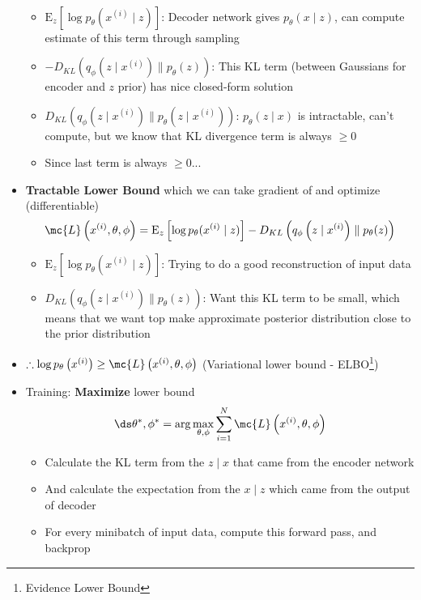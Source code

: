 \begin{itemize}
$$\begin{aligned}
	\end{aligned}$$
	\begin{itemize}
		\item $\mathrm{E}_{z}\left[\log p_\theta(x^{(i)} \mid z)\right]$: Decoder network gives $p_\theta(x\mid z)$, can compute estimate of this term through sampling
		\item $- D_{KL}\left(q_\phi\left(z\mid x^{(i)}\right) \parallel p_\theta(z) \right)$: This KL term (between Gaussians for encoder and $z$ prior) has nice closed-form solution
		\item $D_{KL}\left(q_\phi\left(z\mid x^{(i)}\right) \parallel p_\theta\left(z\mid x^{(i)}\right)\right)$: $p_\theta(z\mid x)$ is intractable, can't compute, but we know that KL divergence term is always $\geq 0$
		\item Since last term is always $\geq 0$...
	\end{itemize}
	\item \textbf{Tractable Lower Bound} which we can take gradient of and optimize (differentiable)
	$$\mc{L}\left(x^{(i)}, \theta, \phi \right) =\mathrm{E}_{z}\left[\log p_\theta(x^{(i)} \mid z)\right] - D_{KL}\left(q_\phi\left(z\mid x^{(i)}\right) \parallel p_\theta(z) \right) $$
	\begin{itemize}
		\item $\mathrm{E}_{z}\left[\log p_\theta(x^{(i)} \mid z)\right]$: Trying to do a good reconstruction of input data
		\item $D_{KL}\left(q_\phi\left(z\mid x^{(i)}\right) \parallel p_\theta(z) \right)$: Want this KL term to be small, which means that we want top make approximate posterior distribution close to the prior distribution 
	\end{itemize}
	\item $\therefore \log p_\theta\left(x^{(i)}\right) \geq \mc{L}\left(x^{(i)}, \theta, \phi \right)$ (Variational lower bound - ELBO\footnote{Evidence Lower Bound})
	\item Training: \textbf{Maximize} lower bound
	$$\ds \theta^\ast, \phi^\ast = \arg\max_{\theta, \phi} \sum_{i=1}^N \mc{L}\left(x^{(i)}, \theta, \phi \right)$$
	\begin{itemize}
		\item Calculate the KL term from the $z\mid x$ that came from the encoder network
		\item And calculate the expectation from the $x\mid z$ which came from the output of decoder
		\item For every minibatch of input data, compute this forward pass, and backprop

\end{itemize}
\end{itemize}
